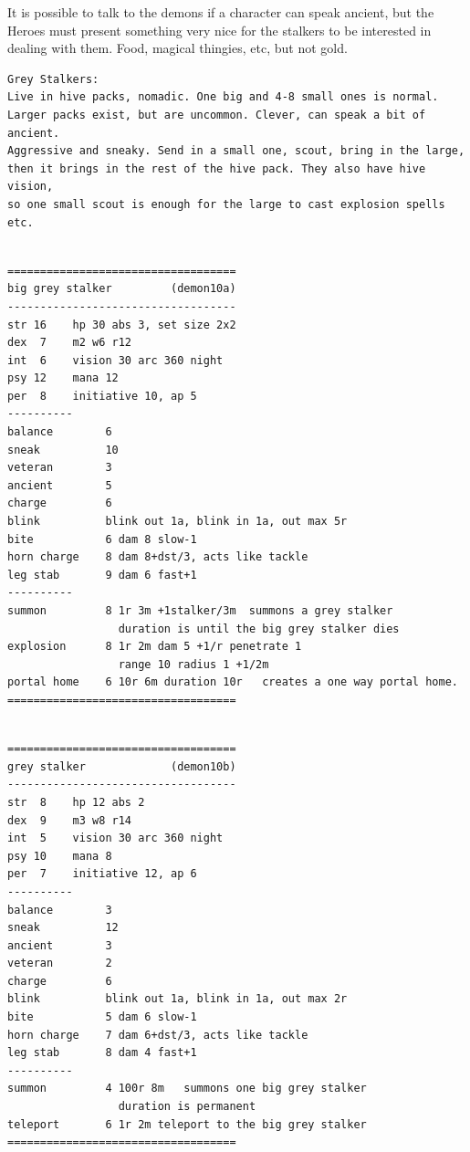 \documentclass[11pt, twoside, titlepage, a4paper]{report}
\begin{document}
It is possible to talk to the demons if a character can speak ancient, but the Heroes must present something very nice for the stalkers to be interested in dealing with them. Food, magical thingies, etc, but not gold.


\small
\begin{verbatim}
Grey Stalkers:
Live in hive packs, nomadic. One big and 4-8 small ones is normal.
Larger packs exist, but are uncommon. Clever, can speak a bit of ancient.
Aggressive and sneaky. Send in a small one, scout, bring in the large,
then it brings in the rest of the hive pack. They also have hive vision,
so one small scout is enough for the large to cast explosion spells etc.


\end{verbatim} \goodbreak \begin{verbatim}
===================================
big grey stalker         (demon10a)
-----------------------------------
str 16    hp 30 abs 3, set size 2x2
dex  7    m2 w6 r12
int  6    vision 30 arc 360 night
psy 12    mana 12
per  8    initiative 10, ap 5
----------
balance        6
sneak          10
veteran        3
ancient        5
charge         6
blink          blink out 1a, blink in 1a, out max 5r
bite           6 dam 8 slow-1
horn charge    8 dam 8+dst/3, acts like tackle
leg stab       9 dam 6 fast+1
----------
summon         8 1r 3m +1stalker/3m  summons a grey stalker
                 duration is until the big grey stalker dies
explosion      8 1r 2m dam 5 +1/r penetrate 1
                 range 10 radius 1 +1/2m
portal home    6 10r 6m duration 10r   creates a one way portal home.
===================================


\end{verbatim} \goodbreak \begin{verbatim}
===================================
grey stalker             (demon10b)
-----------------------------------
str  8    hp 12 abs 2
dex  9    m3 w8 r14
int  5    vision 30 arc 360 night
psy 10    mana 8
per  7    initiative 12, ap 6
----------
balance        3
sneak          12
ancient        3
veteran        2
charge         6
blink          blink out 1a, blink in 1a, out max 2r
bite           5 dam 6 slow-1
horn charge    7 dam 6+dst/3, acts like tackle
leg stab       8 dam 4 fast+1
----------
summon         4 100r 8m   summons one big grey stalker
                 duration is permanent
teleport       6 1r 2m teleport to the big grey stalker
===================================

\end{verbatim}
\normalsize
\end{document}
